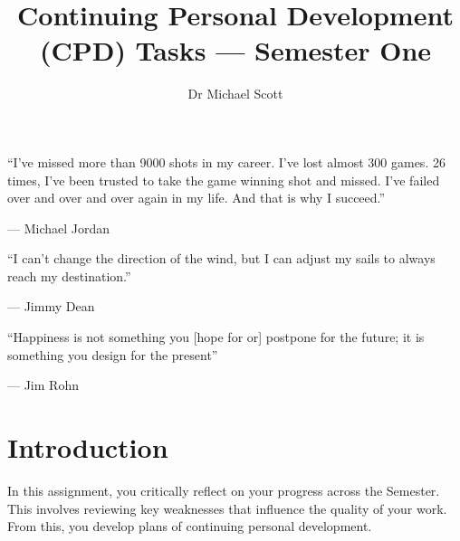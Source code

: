 \documentclass{../../fal_assignment}
\title{Continuing Personal Development (CPD) Tasks --- Semester One}
\author{Dr Michael Scott}
\begin{document}
\maketitle
%    
\begin{marginquote}
    ``I've missed more than 9000 shots in my career. I've lost almost 300 games. 26 times, I've been trusted to take the game winning shot and missed. I've failed over and over and over again in my life. And that is why I succeed.''
    
    --- Michael Jordan

    \marginquoterule

    ``I can't change the direction of the wind, but I can adjust my sails to always reach my destination.''
    
    --- Jimmy Dean
    
    \marginquoterule

    ``Happiness is not something you [hope for or] postpone for the future; it is something you design for the present''
    
    --- Jim Rohn
\end{marginquote}

\section*{Introduction}

In this assignment, you critically reflect on your progress across the Semester. This involves reviewing key weaknesses that influence the quality of your work. From this, you develop plans of continuing personal development.
\end{document}
